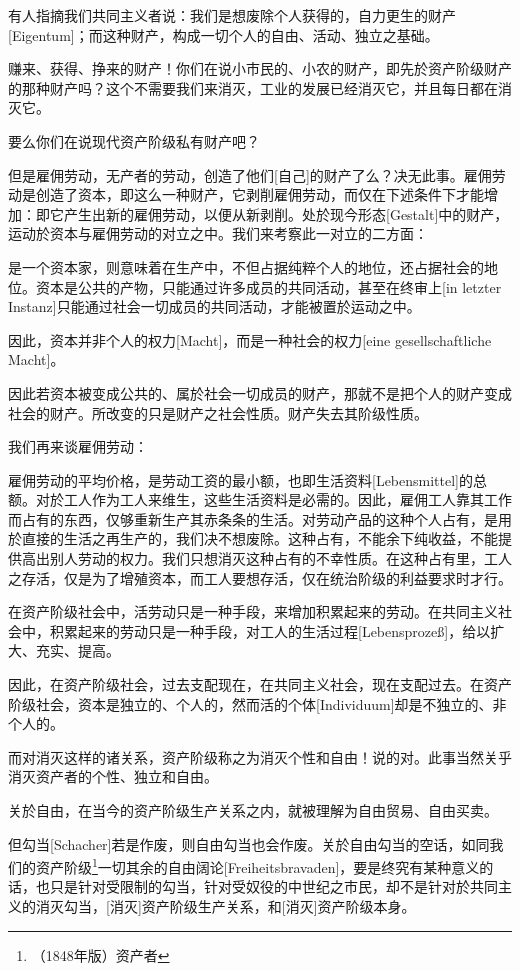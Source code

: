 \documentclass[a4paper,12pt]{ctexart}
\begin{document}
有人指摘我们共同主义者说：我们是想废除个人获得的，自力更生的财产[Eigentum]；而这种财产，构成一切个人的自由、活动、独立之基础。

赚来、获得、挣来的财产！你们在说小市民的、小农的财产，即先於资产阶级财产的那种财产吗？这个不需要我们来消灭，工业的发展已经消灭它，并且每日都在消灭它。

要么你们在说现代资产阶级私有财产吧？

但是雇佣劳动，无产者的劳动，创造了他们[自己]的财产了么？决无此事。雇佣劳动是创造了资本，即这么一种财产，它剥削雇佣劳动，而仅在下述条件下才能增加：即它产生出新的雇佣劳动，以便从新剥削。处於现今形态[Gestalt]中的财产，运动於资本与雇佣劳动的对立之中。我们来考察此一对立的二方面：

是一个资本家，则意味着在生产中，不但占据纯粹个人的地位，还占据社会的地位。资本是公共的产物，只能通过许多成员的共同活动，甚至在终审上[in letzter Instanz]只能通过社会一切成员的共同活动，才能被置於运动之中。

因此，资本并非个人的权力[Macht]，而是一种社会的权力[eine gesellschaftliche Macht]。

因此若资本被变成公共的、属於社会一切成员的财产，那就不是把个人的财产变成社会的财产。所改变的只是财产之社会性质。财产失去其阶级性质。

我们再来谈雇佣劳动：

雇佣劳动的平均价格，是劳动工资的最小额，也即生活资料[Lebensmittel]的总额。对於工人作为工人来维生，这些生活资料是必需的。因此，雇佣工人靠其工作而占有的东西，仅够重新生产其赤条条的生活。对劳动产品的这种个人占有，是用於直接的生活之再生产的，我们决不想废除。这种占有，不能余下纯收益，不能提供高出别人劳动的权力。我们只想消灭这种占有的不幸性质。在这种占有里，工人之存活，仅是为了增殖资本，而工人要想存活，仅在统治阶级的利益要求时才行。

在资产阶级社会中，活劳动只是一种手段，来增加积累起来的劳动。在共同主义社会中，积累起来的劳动只是一种手段，对工人的生活过程[Lebensprozeß]，给以扩大、充实、提高。


因此，在资产阶级社会，过去支配现在，在共同主义社会，现在支配过去。在资产阶级社会，资本是独立的、个人的，然而活的个体[Individuum]却是不独立的、非个人的。

而对消灭这样的诸关系，资产阶级称之为消灭个性和自由！说的对。此事当然关乎消灭资产者的个性、独立和自由。

关於自由，在当今的资产阶级生产关系之内，就被理解为自由贸易、自由买卖。

但勾当[Schacher]若是作废，则自由勾当也会作废。关於自由勾当的空话，如同我们的资产阶级\footnote{（1848年版）资产者}一切其余的自由阔论[Freiheitsbravaden]，要是终究有某种意义的话，也只是针对受限制的勾当，针对受奴役的中世纪之市民，却不是针对於共同主义的消灭勾当，[消灭]资产阶级生产关系，和[消灭]资产阶级本身。
\end{document}
